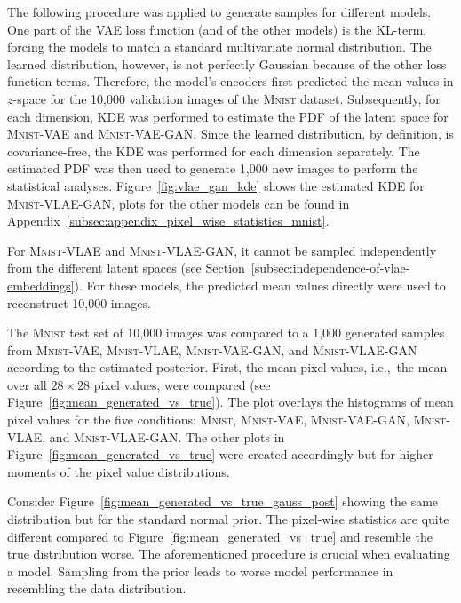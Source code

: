 The following procedure was applied to generate samples for different models.
One part of the \ac{VAE} loss function (and of the other models) is the \ac{KL}-term, forcing the models to match a standard multivariate normal distribution.
The learned distribution, however, is not perfectly Gaussian because of the other loss function terms.
Therefore, the model's encoders first predicted the mean values in $z$-space for the 10,000 validation images of the \textsc{Mnist} dataset.
Subsequently, for each dimension, \ac{KDE} was performed to estimate the \ac{PDF} of the latent space for \textsc{Mnist}-\ac{VAE} and \textsc{Mnist}-\ac{VAE}-\ac{GAN}.
Since the learned distribution, by definition, is covariance-free, the \ac{KDE} was performed for each dimension separately.
The estimated \ac{PDF} was then used to generate 1,000 new images to perform the statistical analyses.
Figure~\ref{fig:vlae_gan_kde} shows the estimated \ac{KDE} for \textsc{Mnist}-\ac{VLAE}-\ac{GAN}, plots for the other models can be found in Appendix~\ref{subsec:appendix_pixel_wise_statistics_mnist}.

For \textsc{Mnist}-\ac{VLAE} and \textsc{Mnist}-\ac{VLAE}-\ac{GAN}, it cannot be sampled independently from the different latent spaces (see Section~\ref{subsec:independence-of-vlae-embeddings}).
For these models, the predicted mean values directly were used to reconstruct 10,000 images.

The \textsc{Mnist} test set of 10,000 images was compared to a 1,000 generated samples from \textsc{Mnist}-\ac{VAE}, \textsc{Mnist}-\ac{VLAE}, \textsc{Mnist}-\ac{VAE}-\ac{GAN}, and \textsc{Mnist}-\ac{VLAE}-\ac{GAN} according to the estimated posterior.
First, the mean pixel values, i.e.,~the mean over all $28\times 28$ pixel values, were compared (see Figure~\ref{fig:mean_generated_vs_true}).
The plot overlays the histograms of mean pixel values for the five conditions: \textsc{Mnist}, \textsc{Mnist}-\ac{VAE}, \textsc{Mnist}-\ac{VAE}-\ac{GAN}, \textsc{Mnist}-\ac{VLAE}, and \textsc{Mnist}-\ac{VLAE}-\ac{GAN}.
The other plots in Figure~\ref{fig:mean_generated_vs_true} were created accordingly but for higher moments of the pixel value distributions.

Consider Figure~\ref{fig:mean_generated_vs_true_gauss_post} showing the same distribution but for the standard normal prior.
The pixel-wise statistics are quite different compared to Figure~\ref{fig:mean_generated_vs_true} and resemble the true distribution worse.
The aforementioned procedure is crucial when evaluating a model.
Sampling from the prior leads to worse model performance in resembling the data distribution.

